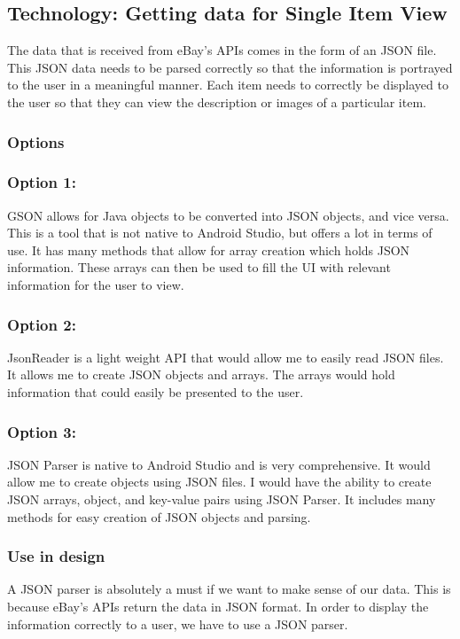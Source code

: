 \documentclass[journal,compsoc, 10pt, draftclsnofoot, onecolumn]{IEEEtran}
\begin{document}
\subsection{Technology: Getting data for Single Item View}
The data that is received from eBay's APIs comes in the form of an JSON file.
This JSON data needs to be parsed correctly so that the information is portrayed
to the user in a meaningful manner. Each item needs to correctly be displayed to
the user so that they can view the description or images of a particular item.

\subsubsection{Options}
\subsubsection*{Option 1: }
GSON allows for Java objects to be converted into JSON objects, and vice versa.
This is a tool that is not native to Android Studio, but offers a lot in terms
of use. It has many methods that allow for array creation which holds JSON
information. These arrays can then be used to fill the UI with relevant
information for the user to view.

\subsubsection*{Option 2: }
JsonReader is a light weight API that would allow me to easily read JSON files.
It allows me to create JSON objects and arrays. The arrays would hold
information that could easily be presented to the user.

\subsubsection*{Option 3: }
JSON Parser is native to Android Studio and is very comprehensive. It would
allow me to create objects using JSON files. I would have the ability to create
JSON arrays, object, and key-value pairs using JSON Parser. It includes many
methods for easy creation of JSON objects and parsing.

\subsubsection{Use in design}
A JSON parser is absolutely a must if we want to make sense of our data. This is
because eBay's APIs return the data in JSON format. In order to display the
information correctly to a user, we have to use a JSON parser.
\end{document}
